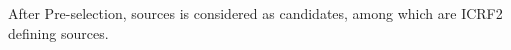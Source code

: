 \documentclass{aa}
\begin{document}
After Pre-selection, 
sources is considered as candidates, among which
are ICRF2 defining sources.





%
%   
\end{document}
